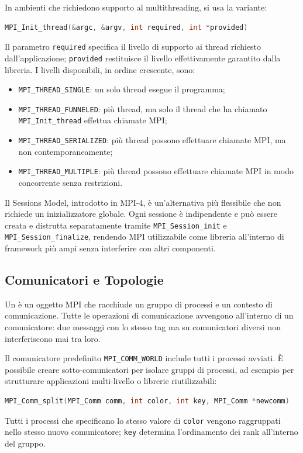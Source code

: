 In ambienti che richiedono supporto al multithreading, si usa la variante:
\begin{lstlisting}[language=C, numbers=none]
MPI_Init_thread(&argc, &argv, int required, int *provided)
\end{lstlisting}
Il parametro \texttt{required} specifica il livello di supporto ai thread richiesto dall'applicazione; \texttt{provided} restituisce il livello effettivamente garantito dalla libreria. I livelli disponibili, in ordine crescente, sono:
\begin{itemize}
    \item \texttt{MPI\_THREAD\_SINGLE}: un solo thread esegue il programma;
    \item \texttt{MPI\_THREAD\_FUNNELED}: più thread, ma solo il thread che ha chiamato \texttt{MPI\_Init\_thread} effettua chiamate MPI;
    \item \texttt{MPI\_THREAD\_SERIALIZED}: più thread possono effettuare chiamate MPI, ma non contemporaneamente;
    \item \texttt{MPI\_THREAD\_MULTIPLE}: più thread possono effettuare chiamate MPI in modo concorrente senza restrizioni.
\end{itemize}

Il Sessions Model, introdotto in MPI-4, è un'alternativa più flessibile che non richiede un inizializzatore globale. Ogni sessione è indipendente e può essere creata e distrutta separatamente tramite \texttt{MPI\_Session\_init} e \texttt{MPI\_Session\_finalize}, rendendo MPI utilizzabile come libreria all'interno di framework più ampi senza interferire con altri componenti.

\subsection{Comunicatori e Topologie}
Un  è un oggetto MPI che racchiude un gruppo di processi e un contesto di comunicazione. Tutte le operazioni di comunicazione avvengono all'interno di un comunicatore: due messaggi con lo stesso tag ma su comunicatori diversi non interferiscono mai tra loro.

Il comunicatore predefinito \texttt{MPI\_COMM\_WORLD} include tutti i processi avviati. È possibile creare sotto-comunicatori per isolare gruppi di processi, ad esempio per strutturare applicazioni multi-livello o librerie riutilizzabili:
\begin{lstlisting}[language=C, numbers=none]
MPI_Comm_split(MPI_Comm comm, int color, int key, MPI_Comm *newcomm)
\end{lstlisting}
Tutti i processi che specificano lo stesso valore di \texttt{color} vengono raggruppati nello stesso nuovo comunicatore; \texttt{key} determina l'ordinamento dei rank all'interno del gruppo.

